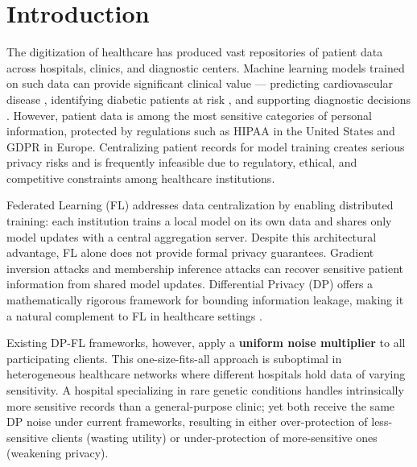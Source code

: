 \documentclass[journal]{IEEEtran}
\begin{document}
\section{Introduction}
\label{sec:intro}

The digitization of healthcare has produced vast repositories of patient data
across hospitals, clinics, and diagnostic centers. Machine learning models
trained on such data can provide significant clinical value --- predicting
cardiovascular disease \cite{detrano1989}, identifying diabetic patients at
risk \cite{smith1988}, and supporting diagnostic decisions \cite{rajpurkar2017}.
However, patient data is among the most sensitive categories of personal
information, protected by regulations such as HIPAA \cite{hipaa1996} in the
United States and GDPR \cite{gdpr2016} in Europe. Centralizing patient records
for model training creates serious privacy risks and is frequently infeasible
due to regulatory, ethical, and competitive constraints among healthcare
institutions.

Federated Learning (FL) \cite{mcmahan2017} addresses data centralization by
enabling distributed training: each institution trains a local model on its
own data and shares only model updates with a central aggregation server.
Despite this architectural advantage, FL alone does not provide formal privacy
guarantees. Gradient inversion attacks \cite{geiping2020} and membership
inference attacks \cite{shokri2017} can recover sensitive patient information
from shared model updates. Differential Privacy (DP) \cite{dwork2006} offers
a mathematically rigorous framework for bounding information leakage, making
it a natural complement to FL in healthcare settings \cite{geyer2017}.

Existing DP-FL frameworks, however, apply a \textbf{uniform noise multiplier}
to all participating clients. This one-size-fits-all approach is suboptimal
in heterogeneous healthcare networks where different hospitals hold data of
varying sensitivity. A hospital specializing in rare genetic conditions handles
intrinsically more sensitive records than a general-purpose clinic; yet both
receive the same DP noise under current frameworks, resulting in either
over-protection of less-sensitive clients (wasting utility) or
under-protection of more-sensitive ones (weakening privacy).
\end{document}
